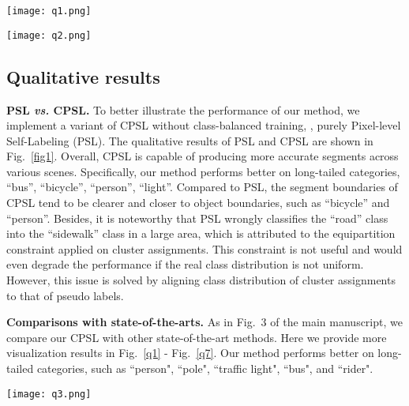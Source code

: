 \documentclass[10pt,twocolumn,letterpaper]{article}
\begin{document}
	\begin{figure*}[!t]
		\centering 
		\texttt{[image: q1.png]}\\ \vspace{-2.5em}
		\caption{Qualitative comparison of different methods on the GTA5Cityscapes task.}
		\label{q1}\vspace{-1.5em}
	\end{figure*}
	\begin{figure*}[!t]
	\centering 
	\texttt{[image: q2.png]}\\
	\vspace{-2.5em}
	\caption{Qualitative comparison of different methods on the GTA5Cityscapes task.}
	\label{q2}
\end{figure*}
	\subsection{Qualitative results}
	\textbf{PSL \textit{vs.} CPSL.} To better illustrate the performance of our method, we implement a variant of CPSL without class-balanced training, \ie, purely Pixel-level Self-Labeling (PSL). The qualitative results of PSL and CPSL are shown in Fig.~\ref{fig1}. Overall, CPSL is capable of producing more accurate segments across various scenes. Specifically, our method performs better on long-tailed categories, \eg “bus”, “bicycle”, “person”, “light”. Compared to PSL, the segment boundaries of CPSL tend to be clearer and closer to object boundaries, such as “bicycle” and “person”. Besides, it is noteworthy that PSL wrongly classifies the “road” class into the “sidewalk” class in a large area, which is attributed to the equipartition constraint applied on cluster assignments. This constraint is not useful and would even degrade the performance if the real class distribution is not uniform. However, this issue is solved by aligning class distribution of cluster assignments to that of pseudo labels. 

	
	
	\textbf{Comparisons with state-of-the-arts.}
	As in Fig.~3 of the main manuscript, we compare our CPSL with other state-of-the-art methods. Here we provide more visualization results in Fig.~\ref{q1} - Fig.~\ref{q7}. Our method performs better on long-tailed categories, such as ``person", ``pole", ``traffic light", ``bus", and ``rider". 
	



\begin{figure*}[!t]
	\centering 
	\texttt{[image: q3.png]}\\
	\vspace{-2.5em}
	\caption{Qualitative comparison of different methods on the GTA5Cityscapes task.}
	\label{q3}
\end{figure*}
\end{document}
